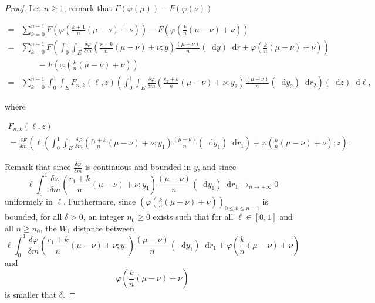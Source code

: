 \documentclass[a4paper,11pt, reqno]{amsart}
\newcommand{\dd}{\mathop{}\!\mathrm{d}}
\newcommand{\1}{\mathbbm{1}}
\theoremstyle{plain}
\theoremstyle{definition}
\begin{document}
\begin{proof}
  Let $n \ge 1$, remark that $F (\varphi (\mu)) - F (\varphi (\nu))$
  
  \begin{align*}
    = & \sum_{k = 0}^{n - 1} F \left( \varphi \left( \frac{k + 1}{n} (\mu -
    \nu) + \nu \right) \right) - F \left( \varphi \left( \frac{k}{n} (\mu -
    \nu) + \nu \right) \right)\\
    = & \sum_{k = 0}^{n - 1} F \left( \int_0^1 \int_E \frac{\delta
    \varphi}{\delta m} \left( \frac{r + k}{n} (\mu - \nu) + \nu ; y \right)
    \frac{(\mu - \nu)}{n} (\dd y) \dd r + \varphi \left( \frac{k}{n}
    (\mu - \nu) + \nu \right) \right)\\
    & \qquad - F \left( \varphi \left( \frac{k}{n} (\mu - \nu) + \nu \right)
    \right)\\
    = & \sum_{k = 0}^{n - 1} \int_0^1 \int_E F_{n, k} (\ell, z) \left(
    \int_0^1 \int_E \frac{\delta \varphi}{\delta m} \left( \frac{r_2 + k}{n}
    (\mu - \nu) + \nu ; y_2 \right) \frac{(\mu - \nu)}{n} (\dd y_2) \dd
    r_2 \right) (\dd z) \dd \ell,
  \end{align*}
  
  where
  
  \begin{multline*}
    F_{n, k} (\ell, z)\\
    = \frac{\delta F}{\delta m} \left( \ell \left( \int_0^1 \int_E
    \frac{\delta \varphi}{\delta m} \left( \frac{r_1 + k}{n} (\mu - \nu) + \nu
    ; y_1 \right) \frac{(\mu - \nu)}{n} (\dd y_1) \dd r_1 \right) +
    \varphi \left( \frac{k}{n} (\mu - \nu) + \nu \right) ; z \right) .
  \end{multline*}
  
  Remark that since $\frac{\delta \varphi}{\delta m}$ is continuous and
  bounded in $y$, and since
  \[ \ell \int_0^1 \frac{\delta \varphi}{\delta m} \left( \frac{r_1 + k}{n}
     (\mu - \nu) + \nu ; y_1 \right) \frac{(\mu - \nu)}{n} (\dd y_1) \dd
     r_1 \to_{n \rightarrow + \infty} 0 \]
  uniformely in $\ell$, Furthermore, since $\left( \varphi \left( \frac{k}{n}
  (\mu - \nu) + \nu \right) \right)_{0 \le k \le n - 1}$ is
  bounded, for all $\delta > 0$, an integer $n_0 \ge 0$ exists such that
  for all $\ell \in [0, 1]$ and all $n \ge n_0$, the $W_1$ distance
  between
  \[ \ell \int_0^1 \frac{\delta \varphi}{\delta m} \left( \frac{r_1 + k}{n}
     (\mu - \nu) + \nu ; y_1 \right) \frac{(\mu - \nu)}{n} (\dd y_1) \dd
     r_1 + \varphi \left( \frac{k}{n} (\mu - \nu) + \nu \right) \]
  and
  \[ \varphi \left( \frac{k}{n} (\mu - \nu) + \nu \right) \]
  is smaller that $\delta$.
  

\end{proof}
\end{document}
